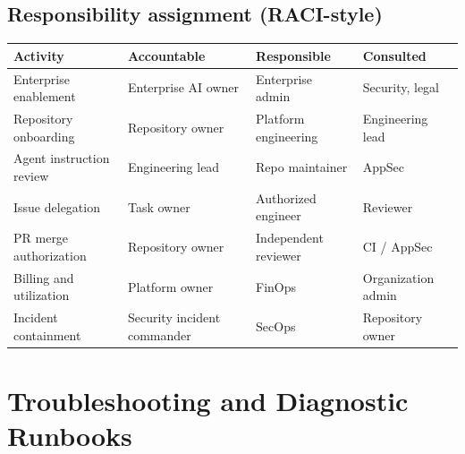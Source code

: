 \documentclass[11pt,letterpaper,oneside]{article}
\begin{document}
\subsection{Responsibility assignment (RACI-style)}
\begin{table}[htbp]
\small
\centering
\begin{tabularx}{\linewidth}{@{}>{\raggedright\arraybackslash}p{3.35cm}>{\raggedright\arraybackslash}p{2.3cm}>{\raggedright\arraybackslash}p{2.3cm}Y@{}}
\toprule
\textbf{Activity} & \textbf{Accountable} & \textbf{Responsible} & \textbf{Consulted}\tabularnewline\midrule
Enterprise enablement & Enterprise AI owner & Enterprise admin & Security, legal\\
Repository onboarding & Repository owner & Platform engineering & Engineering lead\\
Agent instruction review & Engineering lead & Repo maintainer & AppSec\\
Issue delegation & Task owner & Authorized engineer & Reviewer\\
PR merge authorization & Repository owner & Independent reviewer & CI / AppSec\\
Billing and utilization & Platform owner & FinOps & Organization admin\\
Incident containment & Security incident commander & SecOps & Repository owner\\
\bottomrule
\end{tabularx}
\end{table}

\section{Troubleshooting and Diagnostic Runbooks}
\end{document}
